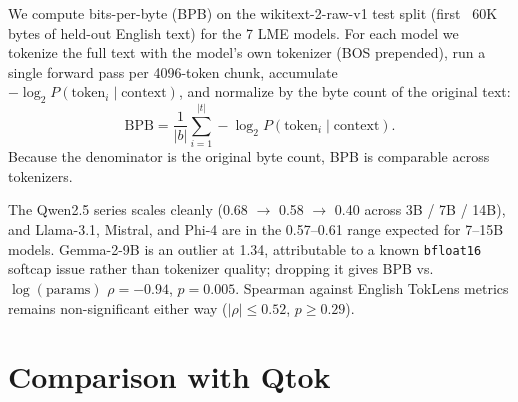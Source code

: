 \documentclass[11pt]{article}
\begin{document}
We compute bits-per-byte (BPB) on the wikitext-2-raw-v1 test split (first ~60K bytes of held-out English text) for the 7 LME models. For each model we tokenize the full text with the model's own tokenizer (BOS prepended), run a single forward pass per 4096-token chunk, accumulate $-\log_2 P(\text{token}_i \mid \text{context})$, and normalize by the byte count of the original text:
\[
\text{BPB} = \frac{1}{|b|} \sum_{i=1}^{|t|} -\log_2 P(\text{token}_i \mid \text{context}).
\]
Because the denominator is the original byte count, BPB is comparable across tokenizers.

\begin{table}[H]
\centering
\small
{}
\caption{Held-out English BPB on wikitext-2-test (first 60{,}190 bytes). $^\dagger$Gemma-2-9B is treated as an outlier; see body.}
\label{tab:bpb}
\end{table}

The Qwen2.5 series scales cleanly (0.68 $\to$ 0.58 $\to$ 0.40 across 3B / 7B / 14B), and Llama-3.1, Mistral, and Phi-4 are in the 0.57--0.61 range expected for 7--15B models. Gemma-2-9B is an outlier at 1.34, attributable to a known \texttt{bfloat16} softcap issue rather than tokenizer quality; dropping it gives BPB vs.\ $\log(\text{params})$ $\rho = -0.94$, $p = 0.005$. Spearman against English TokLens metrics remains non-significant either way ($|\rho| \leq 0.52$, $p \geq 0.29$).

\section{Comparison with Qtok}
\label{app:qtok}
\end{document}
